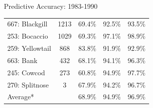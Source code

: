 \documentclass[ xcolor = pdftex, dvipsnames, table ]{beamer}
\begin{document}
\begin{frame}{Predictive Accuracy: 1983-1990}
\begin{center}
{\begin{tabular}[c]{@{}lcccc@{}}
667: Blackgill 	   & 1213  & 69.4\% & 92.5\% & 93.5\% \\
253: Bocaccio 	   & 1029  & 69.3\% & 97.1\% & 98.9\% \\
259: Yellowtail    & 868   & 83.8\% & 91.9\% & 92.9\% \\
663: Bank 	   & 432   & 68.1\% & 94.1\% & 96.3\% \\
245: Cowcod 	   & 273   & 60.8\% & 94.9\% & 97.7\% \\
270: Splitnose 	   & 3     & 67.9\% & 94.2\% & 96.7\% \\ \hline
Average*	   &	   & 68.9\% & 94.9\% & 96.9\% \\ \hline
\end{tabular}}
\end{center}
\end{frame}

%
%
\end{document}

